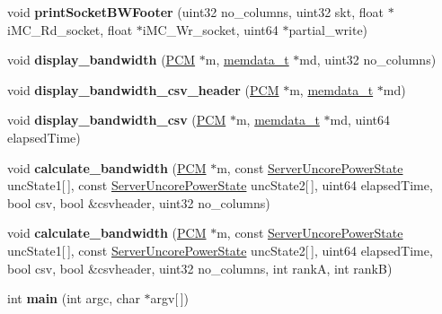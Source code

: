 \begin{DoxyCompactItemize}
void {\bfseries print\+Socket\+B\+W\+Footer} (uint32 no\+\_\+columns, uint32 skt, float $\ast$i\+M\+C\+\_\+\+Rd\+\_\+socket, float $\ast$i\+M\+C\+\_\+\+Wr\+\_\+socket, uint64 $\ast$partial\+\_\+write)
\item 
\mbox{\label{pcm-memory_8cpp_a861b3f495d84afcc926fb027aa6e5be5}} 
void {\bfseries display\+\_\+bandwidth} (\mbox{\hyperlink{class_p_c_m}{P\+CM}} $\ast$m, \mbox{\hyperlink{structmemdata}{memdata\+\_\+t}} $\ast$md, uint32 no\+\_\+columns)
\item 
\mbox{\label{pcm-memory_8cpp_ac61537592a7fd4f6788f89b6138430ff}} 
void {\bfseries display\+\_\+bandwidth\+\_\+csv\+\_\+header} (\mbox{\hyperlink{class_p_c_m}{P\+CM}} $\ast$m, \mbox{\hyperlink{structmemdata}{memdata\+\_\+t}} $\ast$md)
\item 
\mbox{\label{pcm-memory_8cpp_aafa3b8171f7df7faa0cfc5bb78d9441c}} 
void {\bfseries display\+\_\+bandwidth\+\_\+csv} (\mbox{\hyperlink{class_p_c_m}{P\+CM}} $\ast$m, \mbox{\hyperlink{structmemdata}{memdata\+\_\+t}} $\ast$md, uint64 elapsed\+Time)
\item 
\mbox{\label{pcm-memory_8cpp_aabd47f622ef28e0c311ce12b3984806d}} 
void {\bfseries calculate\+\_\+bandwidth} (\mbox{\hyperlink{class_p_c_m}{P\+CM}} $\ast$m, const \mbox{\hyperlink{class_server_uncore_power_state}{Server\+Uncore\+Power\+State}} unc\+State1\mbox{[}$\,$\mbox{]}, const \mbox{\hyperlink{class_server_uncore_power_state}{Server\+Uncore\+Power\+State}} unc\+State2\mbox{[}$\,$\mbox{]}, uint64 elapsed\+Time, bool csv, bool \&csvheader, uint32 no\+\_\+columns)
\item 
\mbox{\label{pcm-memory_8cpp_a7cc33b7bab828e05547e699288e8ced1}} 
void {\bfseries calculate\+\_\+bandwidth} (\mbox{\hyperlink{class_p_c_m}{P\+CM}} $\ast$m, const \mbox{\hyperlink{class_server_uncore_power_state}{Server\+Uncore\+Power\+State}} unc\+State1\mbox{[}$\,$\mbox{]}, const \mbox{\hyperlink{class_server_uncore_power_state}{Server\+Uncore\+Power\+State}} unc\+State2\mbox{[}$\,$\mbox{]}, uint64 elapsed\+Time, bool csv, bool \&csvheader, uint32 no\+\_\+columns, int rankA, int rankB)
\item 
\mbox{\label{pcm-memory_8cpp_a0ddf1224851353fc92bfbff6f499fa97}} 
int {\bfseries main} (int argc, char $\ast$argv\mbox{[}$\,$\mbox{]})
\end{DoxyCompactItemize}
